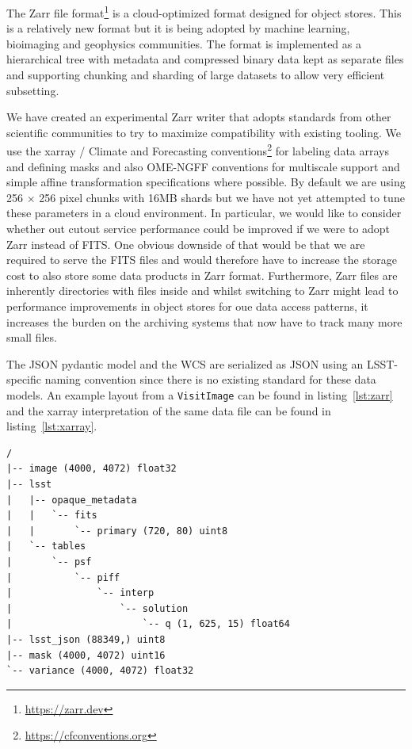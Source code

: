 The Zarr file format\footnote{\url{https://zarr.dev}}\cite{10.5281/zenodo.3773449} is a cloud-optimized format designed for object stores.
This is a relatively new format but it is being adopted by machine learning, bioimaging and geophysics communities.\cite{10.1175/JTECH-D-21-0106.1,10.1007/s00418-023-02209-1,10.1190/tle42070465.1}
The format is implemented as a hierarchical tree with metadata and compressed binary data kept as separate files and supporting chunking and sharding of large datasets to allow very efficient subsetting.

We have created an experimental Zarr writer that adopts standards from other scientific communities to try to maximize compatibility with existing tooling.
We use the xarray / Climate and Forecasting conventions\footnote{\url{https://cfconventions.org}} for labeling data arrays and defining masks and also OME-NGFF\cite{10.1007/s00418-023-02209-1} conventions for multiscale support and simple affine transformation specifications where possible.
By default we are using 256 $\times$ 256 pixel chunks with 16MB shards but we have not yet attempted to tune these parameters in a cloud environment.
In particular, we would like to consider whether out cutout service performance could be improved if we were to adopt Zarr instead of FITS.\cite{DMTN-326}
One obvious downside of that would be that we are required to serve the FITS files and would therefore have to increase the storage cost to also store some data products in Zarr format.
Furthermore, Zarr files are inherently directories with files inside and whilst switching to Zarr might lead to performance improvements in object stores for oue data access patterns, it increases the burden on the archiving systems that now have to track many more small files.

The JSON pydantic model and the WCS are serialized as JSON using an LSST-specific naming convention since there is no existing standard for these data models.
An example layout from a \texttt{VisitImage} can be found in listing~\ref{lst:zarr} and the xarray interpretation of the same data file can be found in listing~\ref{lst:xarray}.

\begin{lstlisting}[caption=Overview of the Zarr layout for a \texttt{VisitImage}, label={lst:zarr}]
/
|-- image (4000, 4072) float32
|-- lsst
|   |-- opaque_metadata
|   |   `-- fits
|   |       `-- primary (720, 80) uint8
|   `-- tables
|       `-- psf
|           `-- piff
|               `-- interp
|                   `-- solution
|                       `-- q (1, 625, 15) float64
|-- lsst_json (88349,) uint8
|-- mask (4000, 4072) uint16
`-- variance (4000, 4072) float32
\end{lstlisting}

